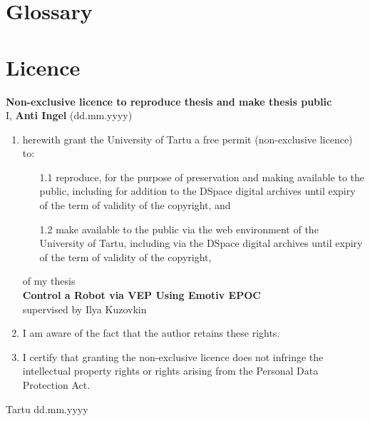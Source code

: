 
\begin{appendices}
\renewcommand{\thechapter}{\Roman{chapter}}
\chapter{Glossary}
\printglossary
\printglossary[type=\acronymtype]
\chapter{Licence}
\textbf{Non-exclusive licence to reproduce thesis and make thesis public}\\[1cm]

\noindent I, \textbf{Anti Ingel} (dd.mm.yyyy)

\begin{enumerate}
	\item herewith grant the University of Tartu a free permit (non-exclusive licence) to:
	\begin{enumerate}
		\item[1.1] reproduce, for the purpose of preservation and making available to the public, including for addition to the DSpace digital archives until expiry of the term of validity of the copyright, and
		\item[1.2] make available to the public via the web environment of the University of Tartu, including via the DSpace digital archives until expiry of the term of validity of the copyright,
	\end{enumerate}
	of my thesis\\
	\textbf{Control a Robot via VEP Using Emotiv EPOC}\\
	supervised by Ilya Kuzovkin
	\item I am aware of the fact that the author retains these rights.
	\item I certify that granting the non-exclusive licence does not infringe the intellectual property rights or rights arising from the Personal Data Protection Act.
\end{enumerate}
\vspace{1cm}
Tartu dd.mm.yyyy


\end{appendices}